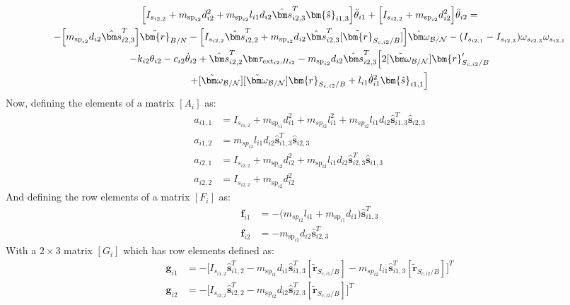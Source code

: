 \begin{multline}
	\Big[I_{s_{i2,2}} + m_{\text{sp}_{i2}} d_{i2}^2 + m_{\text{sp}_{i2}} l_{i1} d_{i2} \hat{\bm s}_{i2,3}^T \bm{\hat{s}}_{i1,3} \Big] \ddot\theta_{i1}
	+ \Big[I_{s_{i2,2}} + m_{\text{sp}_{i2}} d_{i2}^2 \Big] \ddot\theta_{i2}
	= \\
	-\Big[m_{\text{sp}_{i2}} d_{i2} \hat{\bm s}_{i2,3}^T\Big] \ddot{\bm{r}}_{B/N} - \Big[I_{s_{i2,2}} \hat{\bm s}_{i2,2}^T + m_{\text{sp}_{i2}} d_{i2} \hat{\bm s}_{i2,3}^T [\tilde{\bm{r}}_{S_{c,i2}/B}]\Big] \dot{\bm\omega}_{\cal B/N} - (I_{s_{i2,1}} - I_{s_{i2,3}}) \omega_{s_{i2,3}} \omega_{s_{i2,1}} \\
	- k_{i2} \theta_{i2} - c_{i2} \dot{\theta}_{i2} + \hat{\bm s}_{i2,2}^T \bm \tau_{\text{ext}_{i2},H_{i2}}
	-  m_{\text{sp}_{i2}} d_{i2} \hat{\bm s}_{i2,3}^T \Big[ 2 [\tilde{\bm\omega}_{\cal B/N}] \bm{r}'_{S_{c,i2}/B} \\
	+ [\tilde{\bm\omega}_{\cal B/N}] [\tilde{\bm\omega}_{\cal B/N}] \bm{r}_{S_{c,i2}/B} + l_{i1} \dot{\theta}_{i1}^2 \bm{\hat{s}}_{i1,1} \Big]
	\label{eq:sp3final}
\end{multline}
Now, defining the elements of a matrix $[A_i]$ as:
\begin{subequations}
	\begin{align}
		a_{i1,1} &= I_{s_{i1,2}} + m_{\text{sp}_{i1}} d^2_{i1} + m_{sp_{i2}} l^2_{i1}+ m_{sp_{i2}} l_{i1} d_{i2}\hat{\bm s}^T_{i1,3}  \bm{\hat{s}}_{i2,3} \\
		a_{i1,2} &= m_{sp_{i2}} l_{i1} d_{i2} \hat{\bm s}^T_{i1,3}  \bm{\hat{s}}_{i2,3}\\
		a_{i2,1} &= I_{s_{i2,2}} + m_{\text{sp}_{i2}} d^2_{i2}  +  m_{\text{sp}_{i2}} l_{i1} d_{i2}\hat{\bm s}^T_{i2,3}  \bm{\hat{s}}_{i1,3} \\
		a_{i2,2} &= I_{s_{i2,2}} +  m_{\text{sp}_{i2}} d^2_{i2}
	\end{align}
\end{subequations}
And defining the row elements of a matrix $[F_i]$ as:
\begin{subequations}
	\begin{align}
		\bm f_{i1} &= -\big(m_{sp_{i2}} l_{i1} + m_{\text{sp}_{i1}} d_{i1} \big) \hat{\bm s}^T_{i1,3}\\
		\bm f_{i2} &= -m_{\text{sp}_{i2}} d_{i2} \hat{\bm s}_{i2,3}^T
	\end{align}
\end{subequations}
With a $2\times 3$ matrix $[G_i]$ which has row elements defined as:
\begin{subequations}
	\begin{align}
		\bm g_{i1} &= - \Big[I_{s_{i1,2}} \hat{\bm s}_{i1,2}^T - m_{\text{sp}_{i1}} d_{i1} \hat{\bm s}_{i1,3}^T [\tilde{\bm{r}}_{S_{c,i1}/B}] - m_{sp_{i2}} l_{i1} \hat{\bm s}_{i1,3}^T [\tilde{\bm{r}}_{S_{c,i2}/B}] \Big]^T\\
		\bm g_{i2} &= -  \Big[I_{s_{i2,2}} \hat{\bm s}_{i2,2}^T - m_{\text{sp}_{i2}} d_{i2} \hat{\bm s}_{i2,3}^T [\tilde{\bm{r}}_{S_{c,i2}/B}]\Big]^T
	\end{align}
\end{subequations}
